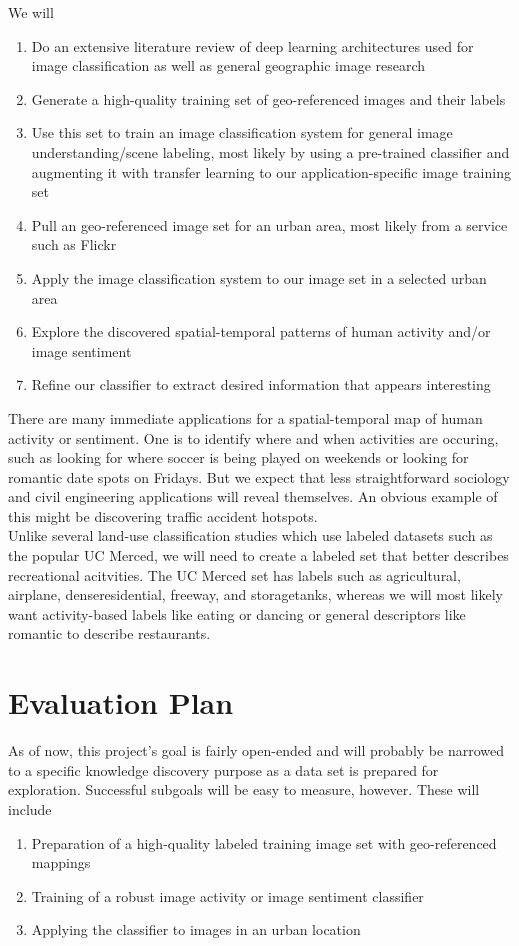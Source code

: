 \documentclass[11pt]{article}
\begin{document}
We will
\begin{enumerate}
	\item Do an extensive literature review of deep learning architectures used for image classification as well as general geographic image research
	\item Generate a high-quality training set of geo-referenced images and their labels
	\item Use this set to train an image classification system for general image understanding/scene labeling, most likely by using a pre-trained classifier and augmenting it with transfer learning to our application-specific image training set
	\item Pull an geo-referenced image set for an urban area, most likely from a service such as Flickr
	\item Apply the image classification system to our image set in a selected urban area
	\item Explore the discovered spatial-temporal patterns of human activity and/or image sentiment
	\item Refine our classifier to extract desired information that appears interesting
\end{enumerate}

There are many immediate applications for a spatial-temporal map of human activity or sentiment. One is to identify where and when activities are occuring, such as looking for where soccer is being played on weekends or looking for romantic date spots on Fridays. But we expect that less straightforward sociology and civil engineering applications will reveal themselves. An obvious example of this might be discovering traffic accident hotspots.\\

Unlike several land-use classification studies which use labeled datasets such as the popular UC Merced, we will need to create a labeled set that better describes recreational acitvities.\cite{castelluccio2015land} The UC Merced set has labels such as agricultural, airplane, denseresidential, freeway, and storagetanks, whereas we will most likely want activity-based labels like eating or dancing or general descriptors like romantic to describe restaurants.\\




\section{Evaluation Plan}
As of now, this project's goal is fairly open-ended and will probably be narrowed to a specific knowledge discovery purpose as a data set is prepared for exploration. Successful subgoals will be easy to measure, however. These will include 
\begin{enumerate}
	\item Preparation of a high-quality labeled training image set with geo-referenced mappings 
	\item Training of a robust image activity or image sentiment classifier
	\item Applying the classifier to images in an urban location
\end{enumerate}


\pagebreak

\end{document}

